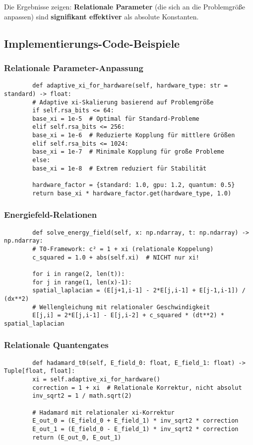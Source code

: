 \documentclass[11pt,a4paper]{article}
\begin{document}
	Die Ergebnisse zeigen: \textbf{Relationale Parameter} (die sich an die Problemgröße anpassen) sind \textbf{signifikant effektiver} als absolute Konstanten.
	
	\subsection{Implementierungs-Code-Beispiele}
	
	\subsubsection{Relationale Parameter-Anpassung}
	\begin{verbatim}
		def adaptive_xi_for_hardware(self, hardware_type: str = standard) -> float:
		# Adaptive xi-Skalierung basierend auf Problemgröße
		if self.rsa_bits <= 64:
		base_xi = 1e-5  # Optimal für Standard-Probleme
		elif self.rsa_bits <= 256:
		base_xi = 1e-6  # Reduzierte Kopplung für mittlere Größen
		elif self.rsa_bits <= 1024:
		base_xi = 1e-7  # Minimale Kopplung für große Probleme
		else:
		base_xi = 1e-8  # Extrem reduziert für Stabilität
		
		hardware_factor = {standard: 1.0, gpu: 1.2, quantum: 0.5}
		return base_xi * hardware_factor.get(hardware_type, 1.0)
	\end{verbatim}
	
	\subsubsection{Energiefeld-Relationen}
	\begin{verbatim}
		def solve_energy_field(self, x: np.ndarray, t: np.ndarray) -> np.ndarray:
		# T0-Framework: c² = 1 + xi (relationale Koppelung)
		c_squared = 1.0 + abs(self.xi)  # NICHT nur xi!
		
		for i in range(2, len(t)):
		for j in range(1, len(x)-1):
		spatial_laplacian = (E[j+1,i-1] - 2*E[j,i-1] + E[j-1,i-1]) / (dx**2)
		# Wellengleichung mit relationaler Geschwindigkeit
		E[j,i] = 2*E[j,i-1] - E[j,i-2] + c_squared * (dt**2) * spatial_laplacian
	\end{verbatim}
	
	\subsubsection{Relationale Quantengates}
	\begin{verbatim}
		def hadamard_t0(self, E_field_0: float, E_field_1: float) -> Tuple[float, float]:
		xi = self.adaptive_xi_for_hardware()
		correction = 1 + xi  # Relationale Korrektur, nicht absolut
		inv_sqrt2 = 1 / math.sqrt(2)
		
		# Hadamard mit relationaler xi-Korrektur
		E_out_0 = (E_field_0 + E_field_1) * inv_sqrt2 * correction
		E_out_1 = (E_field_0 - E_field_1) * inv_sqrt2 * correction
		return (E_out_0, E_out_1)
	\end{verbatim}
	
\end{document}

